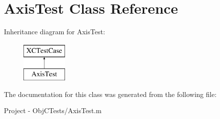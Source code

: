 \hypertarget{interface_axis_test}{}\section{Axis\+Test Class Reference}
\label{interface_axis_test}
Inheritance diagram for Axis\+Test\+:\begin{figure}[H]
\begin{center}
\leavevmode
\includegraphics[height=2.000000cm]{interface_axis_test}
\end{center}
\end{figure}


The documentation for this class was generated from the following file\+:\begin{DoxyCompactItemize}
\item 
Project -\/ Obj\+C\+Tests/Axis\+Test.\+m\end{DoxyCompactItemize}
